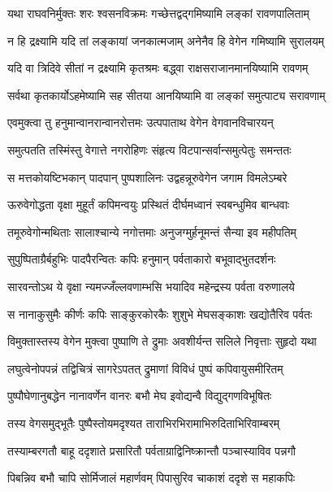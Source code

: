 \twolineshloka
{यथा राघवनिर्मुक्तः शरः श्वसनविक्रमः}
{गच्छेत्तद्वद्गमिष्यामि लङ्कां रावणपालिताम्} %

\twolineshloka
{न हि द्रक्ष्यामि यदि तां लङ्कायां जनकात्मजाम्}
{अनेनैव हि वेगेन गमिष्यामि सुरालयम्} %

\twolineshloka
{यदि वा त्रिदिवे सीतां न द्रक्ष्यामि कृतश्रमः}
{बद्ध्वा राक्षसराजानमानयिष्यामि रावणम्} %

\twolineshloka
{सर्वथा कृतकार्योऽहमेष्यामि सह सीतया}
{आनयिष्यामि वा लङ्कां समुत्पाट्य सरावणाम्} %

\twolineshloka
{एवमुक्त्वा तु हनुमान्वानरान्वानरोत्तमः}
{उत्पपाताथ वेगेन वेगवानविचारयन्} %

\twolineshloka
{समुत्पतति तस्मिंस्तु वेगात्ते नगरोहिणः}
{संहृत्य विटपान्सर्वान्समुत्पेतुः समन्ततः} %

\twolineshloka
{स मत्तकोयष्टिभकान् पादपान् पुष्पशालिनः}
{उद्वहन्नूरुवेगेन जगाम विमलेऽम्बरे} %

\twolineshloka
{ऊरुवेगोद्धता वृक्षा मुहूर्तं कपिमन्वयुः}
{प्रस्थितं दीर्घमध्वानं स्वबन्धुमिव बान्धवाः} %

\twolineshloka
{तमूरुवेगोन्मथिताः सालाश्चान्ये नगोत्तमाः}
{अनुजग्मुर्हनूमन्तं सैन्या इव महीपतिम्} %

\twolineshloka
{सुपुष्पिताग्रैर्बहुभिः पादपैरन्वितः कपिः}
{हनुमान् पर्वताकारो बभूवाद्भुतदर्शनः} %

\twolineshloka
{सारवन्तोऽथ ये वृक्षा न्यमज्जँल्लवणाम्भसि}
{भयादिव महेन्द्रस्य पर्वता वरुणालये} %

\twolineshloka
{स नानाकुसुमैः कीर्णः कपिः साङ्कुरकोरकैः}
{शुशुभे मेघसङ्काशः खद्योतैरिव पर्वतः} %

\twolineshloka
{विमुक्तास्तस्य वेगेन मुक्त्वा पुष्पाणि ते द्रुमाः}
{अवशीर्यन्त सलिले निवृत्ताः सुहृदो यथा} %

\twolineshloka
{लघुत्वेनोपपन्नं तद्विचित्रं सागरेऽपतत्}
{द्रुमाणां विविधं पुष्पं कपिवायुसमीरितम्} %

\twolineshloka
{पुष्पौघेणानुबद्धेन नानावर्णेन वानरः}
{बभौ मेघ इवोद्यन्वै विद्युद्गणविभूषितः} %

\twolineshloka
{तस्य वेगसमुद्भूतैः पुष्पैस्तोयमदृश्यत}
{ताराभिरभिरामाभिरुदिताभिरिवाम्बरम्} %

\twolineshloka
{तस्याम्बरगतौ बाहू ददृशाते प्रसारितौ}
{पर्वताग्राद्विनिष्क्रान्तौ पञ्चास्याविव पन्नगौ} %

\twolineshloka
{पिबन्निव बभौ चापि सोर्मिजालं महार्णवम्}
{पिपासुरिव चाकाशं ददृशे स महाकपिः} %

